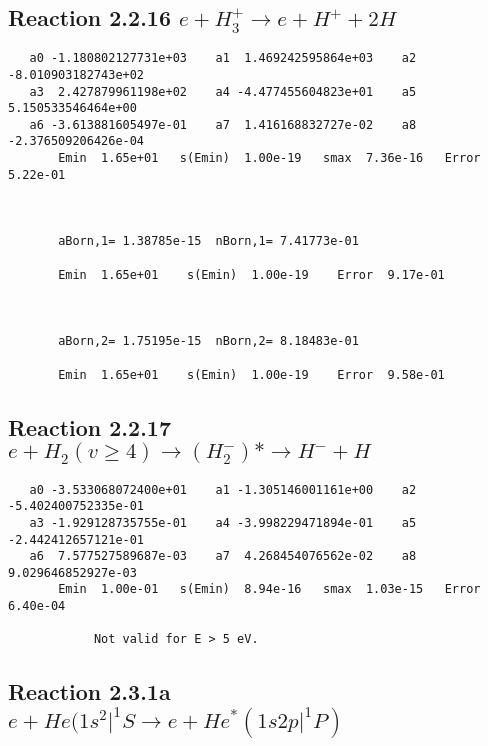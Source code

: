 \documentclass[12pt]{article}
\begin{document}
\newpage
\subsection{
Reaction 2.2.16 $ e + H_3^+ \rightarrow e + H^+ + 2H$}



\begin{small}\begin{verbatim}
   a0 -1.180802127731e+03    a1  1.469242595864e+03    a2 -8.010903182743e+02
   a3  2.427879961198e+02    a4 -4.477455604823e+01    a5  5.150533546464e+00
   a6 -3.613881605497e-01    a7  1.416168832727e-02    a8 -2.376509206426e-04
       Emin  1.65e+01   s(Emin)  1.00e-19   smax  7.36e-16   Error  5.22e-01



       aBorn,1= 1.38785e-15  nBorn,1= 7.41773e-01

       Emin  1.65e+01    s(Emin)  1.00e-19    Error  9.17e-01



       aBorn,2= 1.75195e-15  nBorn,2= 8.18483e-01

       Emin  1.65e+01    s(Emin)  1.00e-19    Error  9.58e-01
\end{verbatim}\end{small}




\newpage
\subsection{
Reaction 2.2.17 $   e + H_2(v \geq 4) \rightarrow (H_2^-)* \rightarrow H^- + H$}



\begin{small}\begin{verbatim}
   a0 -3.533068072400e+01    a1 -1.305146001161e+00    a2 -5.402400752335e-01
   a3 -1.929128735755e-01    a4 -3.998229471894e-01    a5 -2.442412657121e-01
   a6  7.577527589687e-03    a7  4.268454076562e-02    a8  9.029646852927e-03
       Emin  1.00e-01   s(Emin)  8.94e-16   smax  1.03e-15   Error  6.40e-04

            Not valid for E > 5 eV.
\end{verbatim}\end{small}




\newpage
\subsection{
Reaction 2.3.1a $e + He(1s^2|^1S \rightarrow e + He^*(1s2p|^1P)$}
\end{document}
